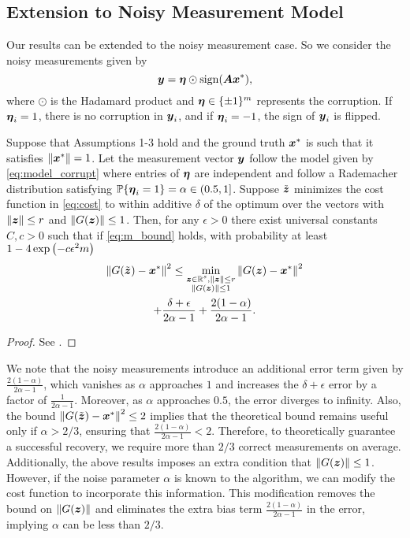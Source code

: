 \documentclass[journal]{IEEEtran}
\DeclareMathOperator{\sign}{sign}
\begin{document}
\subsection{Extension to Noisy Measurement Model}
Our results can be extended to the noisy measurement case. So we consider the noisy measurements given by
\begin{equation}\label{eq:model_corrupt}
    \vecy=\bs{\eta}\odot\sign(\matA\vecx^*),
\end{equation}
where $\odot$ is the Hadamard product and $\boldsymbol{\eta}\in\{\pm1\}^m$ represents the corruption. If $\boldsymbol{\eta}_i=1$, there is no corruption in $\boldsymbol{y}_i$, and if $\boldsymbol{\eta}_i=-1$, the sign of $\boldsymbol{y}_i$ is flipped. 
\begin{cor}\label{cor:noisy}
Suppose that Assumptions 1-3 hold and the ground truth $\boldsymbol{x}^*$ is such that it satisfies $\left\Vert\boldsymbol{x}^*\right\Vert = 1$. Let the measurement vector $\boldsymbol{y}$ follow the model given by \eqref{eq:model_corrupt} where entries of $\boldsymbol{\eta}$ are independent and follow a Rademacher distribution satisfying $\mathbb{P}\{\boldsymbol{\eta}_i=1\}=\alpha\in(0.5,1]$. Suppose $\tilde{\boldsymbol{z}}$ minimizes the cost function in \eqref{eq:cost} to within additive $\delta$ of the optimum over the vectors with $\left\Vert \boldsymbol{z}\right\Vert\leq r$ and $\left\Vert G(\boldsymbol{z})\right\Vert\leq 1$. Then, for any $\epsilon>0$ there exist universal constants $C,c>0$ such that if \eqref{eq:m_bound} holds,
with probability at least $1-4\exp\left(-c\epsilon^2 m\right)$
\begin{multline}\label{eq:l_bound_noisy}
\left\Vert G(\tilde{\boldsymbol{z}})-\boldsymbol{x}^*\right\Vert^2\leq\underset{\substack{\boldsymbol{z}\in\mathbb{R}^s,\left\Vert\boldsymbol{z}\right\Vert\leq r\\\left\Vert G(\boldsymbol{z})\right\Vert\leq 1}}{\min}\left\Vert G(\boldsymbol{z})-\boldsymbol{x}^*\right\Vert^2\\+\frac{\delta+\epsilon}{2\alpha-1}+\frac{2(1-\alpha)}{2\alpha-1}.
\end{multline}
\end{cor}
\begin{proof}
See .
\end{proof}
We note that the noisy measurements introduce an additional error term given by $ \frac{2(1-\alpha)}{2\alpha-1} $, which vanishes as $ \alpha$ approaches $ 1 $ and increases the $\delta+\epsilon$ error by a factor of $ \frac{1}{2\alpha-1} $. Moreover, as $\alpha $ approaches $ 0.5 $, the error diverges to infinity.  Also, the bound $ \left\Vert G(\tilde{\boldsymbol{z}}) - \boldsymbol{x}^* \right\Vert^2 \leq 2 $ implies that the theoretical bound remains useful only if $\alpha > 2/3 $, ensuring that $ \frac{2(1-\alpha)}{2\alpha-1} < 2 $. Therefore, to theoretically guarantee a successful recovery, we require more than $2/3 $ correct measurements on average. Additionally, the above results imposes an extra condition that $\left\Vert G(\boldsymbol{z})\right\Vert\leq 1$. However, if the noise parameter $\alpha$ is known to the algorithm, we can modify the cost function to incorporate this information. This modification removes the bound on $\left\Vert G(\boldsymbol{z})\right\Vert$ and eliminates the extra bias term $ \frac{2(1-\alpha)}{2\alpha-1} $ in the error, implying $\alpha$ can be less than $2/3$.
\end{document}
